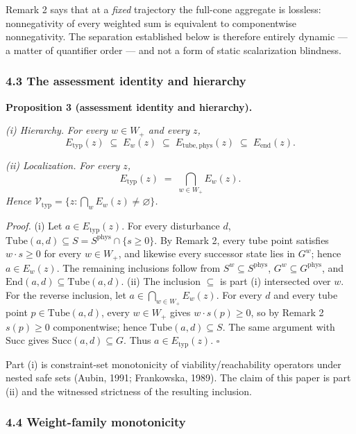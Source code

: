 \documentclass[11pt]{article}
\begin{document}
Remark 2 says that at a \emph{fixed} trajectory the full-cone aggregate
is lossless: nonnegativity of every weighted sum is equivalent to
componentwise nonnegativity. The separation established below is
therefore entirely dynamic --- a matter of quantifier order --- and not
a form of static scalarization blindness.

\subsubsection{4.3 The assessment identity and
hierarchy}\label{the-assessment-identity-and-hierarchy}

\textbf{Proposition 3 (assessment identity and hierarchy).}

\emph{(i) Hierarchy.} \emph{For every \(w \in W_+\) and every \(z\),}
\[E_{\mathrm{typ}}(z) \;\subseteq\; E_w(z) \;\subseteq\; E_{\mathrm{tube,phys}}(z) \;\subseteq\; E_{\mathrm{end}}(z).\]

\emph{(ii) Localization.} \emph{For every \(z\),}
\[E_{\mathrm{typ}}(z) \;=\; \bigcap_{w \in W_+} E_w(z).\] \emph{Hence
\(\mathcal{V}_{\mathrm{typ}} = \{ z : \bigcap_w E_w(z) \neq \varnothing \}\).}

\emph{Proof.} (i) Let \(a \in E_{\mathrm{typ}}(z)\). For every
disturbance \(d\),
\(\mathrm{Tube}(a,d) \subseteq S = S^{\mathrm{phys}} \cap \{s \ge 0\}\).
By Remark 2, every tube point satisfies \(w \cdot s \ge 0\) for every
\(w \in W_+\), and likewise every successor state lies in \(G^w\); hence
\(a \in E_w(z)\). The remaining inclusions follow from
\(S^w \subseteq S^{\mathrm{phys}}\),
\(G^w \subseteq G^{\mathrm{phys}}\), and
\(\mathrm{End}(a,d) \subseteq \mathrm{Tube}(a,d)\). (ii) The inclusion
\(\subseteq\) is part (i) intersected over \(w\). For the reverse
inclusion, let \(a \in \bigcap_{w \in W_+} E_w(z)\). For every \(d\) and
every tube point \(p \in \mathrm{Tube}(a,d)\), every \(w \in W_+\) gives
\(w \cdot s(p) \ge 0\), so by Remark 2 \(s(p) \ge 0\) componentwise;
hence \(\mathrm{Tube}(a,d) \subseteq S\). The same argument with
\(\mathrm{Succ}\) gives \(\mathrm{Succ}(a,d) \subseteq G\). Thus
\(a \in E_{\mathrm{typ}}(z)\). \ensuremath{\square}

Part (i) is constraint-set monotonicity of viability/reachability
operators under nested safe sets (Aubin, 1991; Frankowska, 1989). The
claim of this paper is part (ii) and the witnessed strictness of the
resulting inclusion.

\subsubsection{4.4 Weight-family
monotonicity}\label{weight-family-monotonicity}
\end{document}
